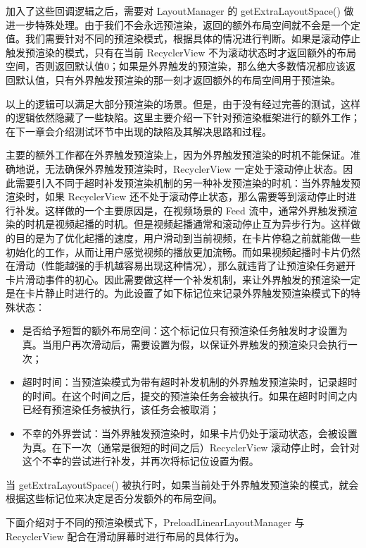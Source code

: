 加入了这些回调逻辑之后，需要对 LayoutManager 的 getExtraLayoutSpace() 做进一步特殊处理。由于我们不会永远预渲染，返回的额外布局空间就不会是一个定值。我们需要针对不同的预渲染模式，根据具体的情况进行判断。如果是滚动停止触发预渲染的模式，只有在当前 RecyclerView 不为滚动状态时才返回额外的布局空间，否则返回默认值0；如果是外界触发的预渲染，那么绝大多数情况都应该返回默认值，只有外界触发预渲染的那一刻才返回额外的布局空间用于预渲染。

以上的逻辑可以满足大部分预渲染的场景。但是，由于没有经过完善的测试，这样的逻辑依然隐藏了一些缺陷。这里主要介绍一下针对预渲染框架进行的额外工作；在下一章会介绍测试环节中出现的缺陷及其解决思路和过程。

主要的额外工作都在外界触发预渲染上，因为外界触发预渲染的时机不能保证。准确地说，无法确保外界触发预渲染时，RecyclerView 一定处于滚动停止状态。因此需要引入不同于超时补发预渲染机制的另一种补发预渲染的时机：当外界触发预渲染时，如果 RecyclerView 还不处于滚动停止状态，那么需要等到滚动停止时进行补发。这样做的一个主要原因是，在视频场景的 Feed 流中，通常外界触发预渲染的时机是视频起播的时机。但是视频起播通常和滚动停止互为异步行为。这样做的目的是为了优化起播的速度，用户滑动到当前视频，在卡片停稳之前就能做一些初始化的工作，从而让用户感觉视频的播放更加流畅。而如果视频起播时卡片仍然在滑动（性能越强的手机越容易出现这种情况），那么就违背了让预渲染任务避开卡片滑动事件的初心。因此需要做这样一个补发机制，来让外界触发的预渲染一定是在卡片静止时进行的。为此设置了如下标记位来记录外界触发预渲染模式下的特殊状态：

\begin{itemize}
    \item 是否给予短暂的额外布局空间：这个标记位只有预渲染任务触发时才设置为真。当用户再次滑动后，需要设置为假，以保证外界触发的预渲染只会执行一次；
    \item 超时时间：当预渲染模式为带有超时补发机制的外界触发预渲染时，记录超时的时间。在这个时间之后，提交的预渲染任务会被执行。如果在超时时间之内已经有预渲染任务被执行，该任务会被取消；
    \item 不幸的外界尝试：当外界触发预渲染时，如果卡片仍处于滚动状态，会被设置为真。在下一次（通常是很短的时间之后）RecyclerView 滚动停止时，会针对这个不幸的尝试进行补发，并再次将标记位设置为假。
\end{itemize}

当 getExtraLayoutSpace() 被执行时，如果当前处于外界触发预渲染的模式，就会根据这些标记位来决定是否分发额外的布局空间。

下面介绍对于不同的预渲染模式下，PreloadLinearLayoutManager 与 RecyclerView 配合在滑动屏幕时进行布局的具体行为。


